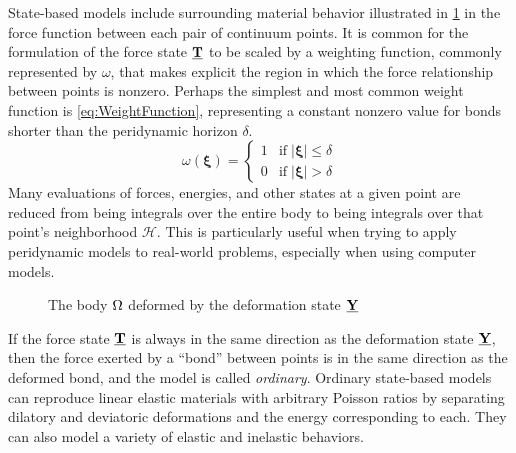State-based models include surrounding material behavior illustrated in \cref{fig:pdDeformed} in the force function between each pair of continuum points. 
It is common for the formulation of the force state $\vstate{T}{}{}$ to be scaled by a weighting function, commonly represented by $\omega$, that makes explicit the region in which the force relationship between points is nonzero.
Perhaps the simplest and most common weight function is \cref{eq:WeightFunction}, representing a constant nonzero value for bonds shorter than the peridynamic horizon $\delta$.
%
\begin{equation}
\label{eq:WeightFunction}
\omega(\boldsymbol{\xi}) = 
\begin{cases}
1 & \text{if}\; |\boldsymbol{\xi}| \leq \delta \\
0 & \text{if}\; |\boldsymbol{\xi}| > \delta
\end{cases}
\end{equation}
%
Many evaluations of forces, energies, and other states at a given point are reduced from being integrals over the entire body to being integrals over that point's neighborhood $\mathcal{H}$.
This is particularly useful when trying to apply peridynamic models to real-world problems, especially when using computer models. 
%
\begin{figure}[h]
  \centering
{}
\caption{The body \protect\(\protect\Omega\protect\) deformed by the deformation state \protect\(\protect\vstate{Y}{}{}\protect\)}
\label{fig:pdDeformed}
\end{figure}
%
If the force state $\vstate{T}{}{}$ is always in the same direction as the deformation state $\vstate{Y}{}{}$, then the force exerted by a ``bond'' between points is in the same direction as the deformed bond, and the model is called \textit{ordinary}.  
Ordinary state-based models can reproduce linear elastic materials with arbitrary Poisson ratios by separating dilatory and deviatoric deformations and the energy corresponding to each.
They can also model a variety of elastic and inelastic behaviors.

